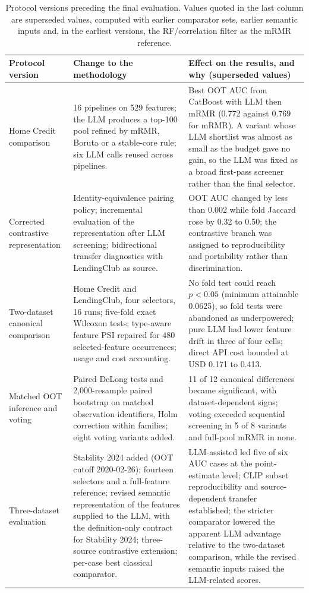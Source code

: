 \documentclass[final,5p,twocolumn]{elsarticle}
\begin{document}
\begin{table}[htbp]
\centering
\footnotesize
\setlength{\tabcolsep}{5pt}
\begin{threeparttable}
\caption{Protocol versions preceding the final evaluation. Values quoted in the last column are superseded values, computed with earlier comparator sets, earlier semantic inputs and, in the earliest versions, the RF/correlation filter as the mRMR reference.}
\label{tab:stages}
\begin{tabular}{@{}L{27mm}L{\dimexpr(\textwidth-27mm-4\tabcolsep)/2\relax}L{\dimexpr(\textwidth-27mm-4\tabcolsep)/2\relax}@{}}
\toprule
Protocol version & Change to the methodology & Effect on the results, and why (superseded values) \\
\midrule
Home Credit comparison & 16 pipelines on 529 features; the LLM produces a top-100 pool refined by mRMR, Boruta or a stable-core rule; six LLM calls reused across pipelines. & Best OOT AUC from CatBoost with LLM then mRMR (0.772 against 0.769 for mRMR). A variant whose LLM shortlist was almost as small as the budget gave no gain, so the LLM was fixed as a broad first-pass screener rather than the final selector. \\
\addlinespace
Corrected contrastive representation & Identity-equivalence pairing policy; incremental evaluation of the representation after LLM screening; bidirectional transfer diagnostics with LendingClub as source. & OOT AUC changed by less than 0.002 while fold Jaccard rose by 0.32 to 0.50; the contrastive branch was assigned to reproducibility and portability rather than discrimination. \\
\addlinespace
Two-dataset canonical comparison & Home Credit and LendingClub, four selectors, 16 runs; five-fold exact Wilcoxon tests; type-aware feature PSI repaired for 480 selected-feature occurrences; usage and cost accounting. & No fold test could reach $p<0.05$ (minimum attainable 0.0625), so fold tests were abandoned as underpowered; pure LLM had lower feature drift in three of four cells; direct API cost bounded at USD 0.171 to 0.413. \\
\addlinespace
Matched OOT inference and voting & Paired DeLong tests and 2,000-resample paired bootstrap on matched observation identifiers, Holm correction within families; eight voting variants added. & 11 of 12 canonical differences became significant, with dataset-dependent signs; voting exceeded sequential screening in 5 of 8 variants and full-pool mRMR in none. \\
\addlinespace
Three-dataset evaluation & Stability 2024 added (OOT cutoff 2020-02-26); fourteen selectors and a full-feature reference; revised semantic representation of the features supplied to the LLM, with the definition-only contract for Stability 2024; three-source contrastive extension; per-case best classical comparator. & LLM-assisted led five of six AUC cases at the point-estimate level; CLIP subset reproducibility and source-dependent transfer established; the stricter comparator lowered the apparent LLM advantage relative to the two-dataset comparison, while the revised semantic inputs raised the LLM-related scores. \\

\end{tabular}
\end{threeparttable}
\end{table}
\end{document}
